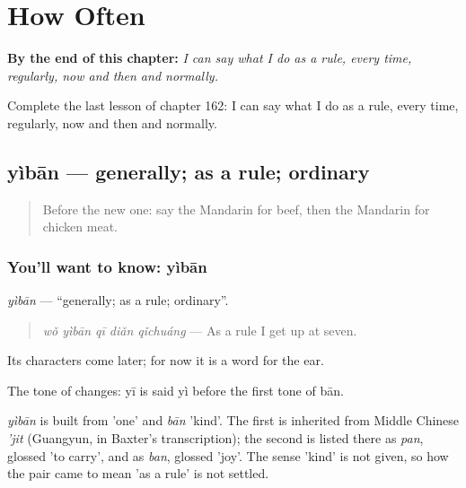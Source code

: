 
\chapter{How Often}
\label{ch:zh-how-often}

\begin{chapteropening}
\textbf{By the end of this chapter:} \emph{I can say what I do as a rule, every time, regularly, now and then and normally.}

Complete the last lesson of chapter 162: I can say what I do as a rule, every time, regularly, now and then and normally.
\end{chapteropening}

\section[yìbān]{yìbān — generally; as a rule; ordinary}

\label{lesson:ZH-C162-yiban}



\begin{quote}
Before the new one: say the Mandarin for beef, then the Mandarin for chicken meat.
\end{quote}

\subsection*{You'll want to know: yìbān}
\emph{yìbān} — \textquotedblleft{}generally; as a rule; ordinary\textquotedblright{}.

\begin{quote}
\emph{wǒ yìbān qī diǎn qǐchuáng} — As a rule I get up at seven.
\end{quote}

Its characters come later; for now it is a word for the ear.

The tone of  changes: yī is said yì before the first tone of bān.

\begin{cousinweb}
\emph{yìbān} is built from  'one' and \emph{bān} 'kind'. The first is inherited from Middle Chinese \emph{'jit} (Guangyun, in Baxter's transcription); the second is listed there as \emph{pan}, glossed 'to carry', and as \emph{ban}, glossed 'joy'. The sense 'kind' is not given, so how the pair came to mean 'as a rule' is not settled.
\end{cousinweb}

